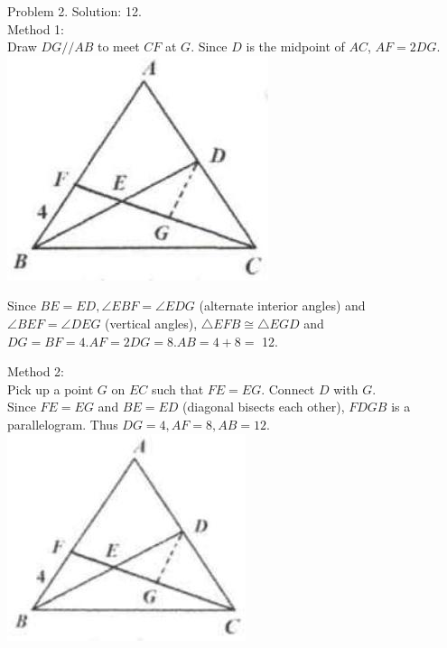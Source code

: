 \documentclass[10pt]{article}
\begin{document}
Problem 2. Solution: 12.\\
Method 1:\\
Draw \(D G / / A B\) to meet \(C F\) at \(G\). Since \(D\) is the midpoint of \(A C\), \(A F=2 D G\).\\
\includegraphics[max width=\textwidth, center]{2025_04_17_97bc1f7e44d93c271a88g-131(1)}


Since \(B E=E D, \angle E B F=\angle E D G\) (alternate interior angles) and \(\angle B E F=\angle D E G\) (vertical angles), \(\triangle E F B \cong \triangle E G D\) and \(D G=B F=4 . A F=2 D G=8 . A B=4+8=\) 12.

Method 2:\\
Pick up a point \(G\) on \(E C\) such that \(F E=E G\). Connect \(D\) with \(G\).\\
Since \(F E=E G\) and \(B E=E D\) (diagonal bisects each other), \(F D G B\) is a parallelogram. Thus \(D G=4, A F=8, A B=12\).\\
\includegraphics[max width=\textwidth, center]{2025_04_17_97bc1f7e44d93c271a88g-132(1)}
\end{document}

